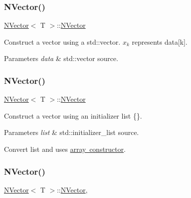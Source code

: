 \subsubsection{\texorpdfstring{NVector()}{NVector()}\hspace{0.1cm}{\footnotesize\ttfamily [1/5]}}
{\footnotesize\ttfamily \mbox{\hyperlink{class_n_vector}{N\+Vector}}$<$ T $>$\+::\mbox{\hyperlink{class_n_vector}{N\+Vector}}\hspace{0.3cm}{\ttfamily [inline]}}



Construct a vector using a {\ttfamily std\+::vector}. $ x_k $ represents {\ttfamily data\mbox{[}k\mbox{]}}. 


\begin{DoxyParams}{Parameters}
{\em data} & {\ttfamily std\+::vector} source. \\
\hline
\end{DoxyParams}
\mbox{\label{class_vector3_a44c7b132c668c2aac890b66fe7ab0262}} 
\subsubsection{\texorpdfstring{NVector()}{NVector()}\hspace{0.1cm}{\footnotesize\ttfamily [2/5]}}
{\footnotesize\ttfamily \mbox{\hyperlink{class_n_vector}{N\+Vector}}$<$ T $>$\+::\mbox{\hyperlink{class_n_vector}{N\+Vector}}\hspace{0.3cm}{\ttfamily [inline]}}



Construct a vector using an initializer list {\ttfamily \{\}}. 


\begin{DoxyParams}{Parameters}
{\em list} & {\ttfamily std\+::initializer\+\_\+list} source.\\
\hline
\end{DoxyParams}
Convert {\ttfamily list} and uses \mbox{\hyperlink{class_n_vector}{array constructor}}. \mbox{\label{class_vector3_a58eee5f012e4e563d477788051fc7f1d}} 
\subsubsection{\texorpdfstring{NVector()}{NVector()}\hspace{0.1cm}{\footnotesize\ttfamily [3/5]}}
{\footnotesize\ttfamily \mbox{\hyperlink{class_n_vector}{N\+Vector}}$<$ T $>$\+::\mbox{\hyperlink{class_n_vector}{N\+Vector}}\hspace{0.3cm}{\ttfamily [inline]}, {\ttfamily [explicit]}}



